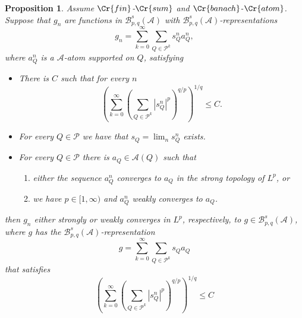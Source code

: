 \documentclass{amsart}
\newtheorem{proposition}[theorem]{Proposition}
\theoremstyle{definition}
\newcommand{\SP}{{\mathcal P}}
\newcommand{\Crr}[1]{\Cr{#1}}
\begin{document}
\begin{proposition}\label{compa2} Assume ${\Crr{fin}}$-${\Crr{sum}}$ and ${\Crr{banach}}$-${\Crr{atom}}$. Suppose that $g_n$ are functions in $\mathcal{B}^s_{p,q}(\mathcal{A})$ with  $\mathcal{B}^s_{p,q}(\mathcal{A})$-representations 
$$g_n=\sum_{k=0}^{\infty}\sum_{Q\in \SP^k}s_Q^na_Q^n,$$
where $a_Q^n$ is a $\mathcal{A}$-atom supported on $Q$, satisfying 
\begin{itemize}
\item[i.] There is $C$ such that for every $n$ 
\begin{equation}\label{estt}  (\sum_{k=0}^{\infty}(\sum_{Q\in \SP^k}|s_Q^n|^p)^{q/p})^{1/q}\leq C.\end{equation} 
\item[ii.] For every $Q\in \mathcal{P}$ we have that $s_Q=\lim_n s_Q^n$ exists. 
\item[iii.] For every $Q\in \mathcal{P}$ there is  $a_Q\in \mathcal{A}(Q)$ such that 
\begin{enumerate}
\item  either the sequence $a_Q^n$ converges to $a_Q$  in the strong topology  of $L^p$, or
\item we have  $p\in [1,\infty)$ and $a_Q^n$ weakly converges to  $a_Q$.
\end{enumerate}
\end{itemize}
then $g_n$ either strongly or weakly  converges in $L^p$, respectively,  to $g \in \mathcal{B}^s_{p,q}(\mathcal{A})$,  where  $g$ has  the   $\mathcal{B}^s_{p,q}(\mathcal{A})$-representation
\begin{equation}\label{repp} g=\sum_{k=0}^{\infty}\sum_{Q\in \SP^k}s_Q a_Q\end{equation} 
that satisfies 
\begin{equation}\label{estt2} (\sum_{k=0}^{\infty}(\sum_{Q\in \SP^k}|s_Q^n|^p)^{q/p})^{1/q}\leq C\end{equation} 
\end{proposition}
\end{document}
